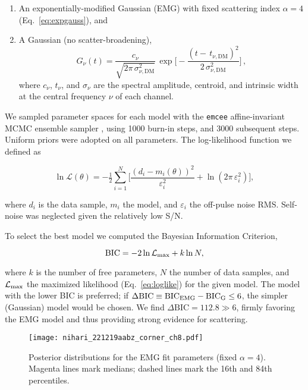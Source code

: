 \documentclass[twocolumn, linenumbers, tra]{aastex631}
\begin{document}
{\begin{enumerate}
  \item An exponentially-modified Gaussian (EMG) with fixed scattering index $\alpha=4$ (Eq.~\ref{eq:expgauss}), and 
  \item A Gaussian (no scatter-broadening), 
\begin{equation}\label{eq:gauss}
 G_\nu(t)
 =\frac{c_{\nu}}{\sqrt{2\pi\,\sigma_{\nu,\mathrm{DM}}^2}}\,
  \exp\Biggl[-\frac{(t-\,t_{\nu,\mathrm{DM}})^2}{2\,\sigma_{\nu,\mathrm{DM}}^2}\Biggr]\,,
\end{equation}
where $c_\nu$, $t_{\nu}$, and $\sigma_\nu$ are the spectral amplitude, centroid, and intrinsic width at the central frequency $\nu$ of each channel.
\end{enumerate}

We sampled parameter spaces for each model with the \texttt{emcee} affine-invariant MCMC ensemble sampler \citep{ForemanMackey2013}, using 1000 burn-in steps, and 3000 subsequent steps. Uniform priors were adopted on all parameters. The log-likelihood function we defined as

\begin{equation}\label{eq:loglike}
  \ln\mathcal{L}(\theta)
 =-\tfrac12\sum_{i=1}^N\Biggl[\frac{(d_i-m_i(\theta))^2}{\varepsilon_i^2}
  +\ln(2\pi\,\varepsilon_i^2)\Biggr], 
\end{equation}

where $d_i$ is the data sample, $m_i$ the model, and $\varepsilon_i$ the off-pulse noise RMS. Self-noise was neglected given the relatively low S/N.

To select the best model we computed the Bayesian Information Criterion, 

\begin{equation}
  \mathrm{BIC}=-2\ln\mathcal{L}_{\rm max}+k\ln N, 
\end{equation}

\noindent
where $k$ is the number of free parameters, $N$ the number of data samples, and $\mathcal{L}_{\rm max}$ the maximized likelihood (Eq.~\ref{eq:loglike}) for the given model. The model with the lower BIC is preferred; if $\Delta\mathrm{BIC}\equiv\mathrm{BIC}_{\rm EMG}-\mathrm{BIC}_{\rm G}\le6$, the simpler (Gaussian) model would be chosen. We find $\Delta\mathrm{BIC}=112.8\gg6$, firmly favoring the EMG model and thus providing strong evidence for scattering.

\begin{figure}
 \centering
 \texttt{[image: nihari\_221219aabz\_corner\_ch8.pdf]}
 \caption{Posterior distributions for the EMG fit parameters (fixed $\alpha=4$). Magenta lines mark medians; dashed lines mark the 16th and 84th percentiles.}
 \label{fig:corner}
\end{figure}
}
\end{document}
